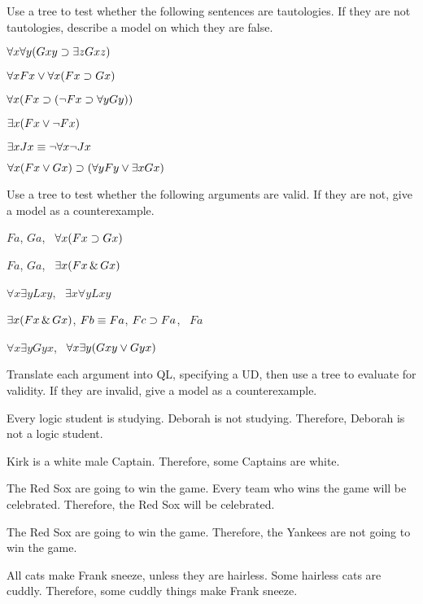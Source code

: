 \practiceproblems

\solutions
\problempart
\label{pr.QL.trees.tautology}
Use a tree to test whether the following sentences are tautologies. If they are not tautologies, describe a model on which they are false.
\begin{earg}
\item $\forall x \forall y (Gxy \supset \exists z Gxz)$
\item $\forall x Fx \vee \forall x (Fx \supset Gx)$
\item $\forall x (Fx \supset (\neg Fx \supset \forall y Gy))$
\item $\exists x (Fx \vee \neg Fx)$
\item $\exists x Jx \equiv \neg \forall x \neg Jx$
\item $\forall x (Fx \vee Gx) \supset (\forall y Fy \vee \exists x Gx)$
\end{earg}

\solutions
\problempart
\label{pr.QL.trees.validity}
Use a tree to test whether the following arguments are valid. If they are not, give a model as a counterexample.
\begin{earg}
\item $Fa$, $Ga$, \therefore\ $\forall x (Fx \supset Gx)$
\item $Fa$, $Ga$, \therefore\ $\exists x (Fx \,\&\, Gx)$
\item $\forall x \exists y Lxy$, \therefore\ $\exists x \forall y Lxy$
\item $\exists x (Fx \,\&\, Gx)$, $Fb \equiv Fa$, $Fc \supset Fa$, \therefore\ $Fa$
\item $\forall x \exists y Gyx$, \therefore\ $\forall x \exists y (Gxy \vee Gyx)$
\end{earg}

\problempart
\label{pr.QL.trees.translation.and.validity}
Translate each argument into QL, specifying a UD, then use a tree to evaluate for validity. If they are invalid, give a model as a counterexample.
\begin{earg}
\item Every logic student is studying. Deborah is not studying. Therefore, Deborah is not a logic student.
\item Kirk is a white male Captain. Therefore, some Captains are white.
\item The Red Sox are going to win the game. Every team who wins the game will be celebrated. Therefore, the Red Sox will be celebrated.
\item The Red Sox are going to win the game. Therefore, the Yankees are not going to win the game.
\item All cats make Frank sneeze, unless they are hairless. Some hairless cats are cuddly. Therefore, some cuddly things make Frank sneeze.
\end{earg}